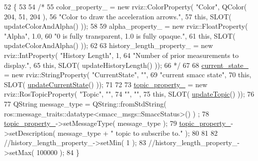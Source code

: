 \begin{DoxyCode}
52 \{
53 
54   \textcolor{comment}{/*}
55 \textcolor{comment}{  color\_property\_ = new rviz::ColorProperty( "Color", QColor( 204, 51, 204 ),}
56 \textcolor{comment}{                                             "Color to draw the acceleration arrows.",}
57 \textcolor{comment}{                                             this, SLOT( updateColorAndAlpha() ));}
58 \textcolor{comment}{}
59 \textcolor{comment}{  alpha\_property\_ = new rviz::FloatProperty( "Alpha", 1.0,}
60 \textcolor{comment}{                                             "0 is fully transparent, 1.0 is fully opaque.",}
61 \textcolor{comment}{                                             this, SLOT( updateColorAndAlpha() ));}
62 \textcolor{comment}{}
63 \textcolor{comment}{  history\_length\_property\_ = new rviz::IntProperty( "History Length", 1,}
64 \textcolor{comment}{                                                    "Number of prior measurements to display.",}
65 \textcolor{comment}{                                                    this, SLOT( updateHistoryLength() ));}
66 \textcolor{comment}{                                                    */}
67 
68   \hyperlink{classsmacc__rviz__plugin_1_1SmaccRvizDisplay_a342ff238c1dfaa427f09ee205a9e92d5}{current\_state\_} = \textcolor{keyword}{new} rviz::StringProperty( \textcolor{stringliteral}{"CurrentState"}, \textcolor{stringliteral}{""},
69                                                     \textcolor{stringliteral}{"current smacc state"},
70                                                     \textcolor{keyword}{this}, SLOT( 
      \hyperlink{classsmacc__rviz__plugin_1_1SmaccRvizDisplay_a6031090e46077a5e95754b5f70ea639a}{updateCurrentState}() ));
71 
72   
73   \hyperlink{classsmacc__rviz__plugin_1_1SmaccRvizDisplay_ad81e5239e1343b2ba01ee16d1f010932}{topic\_property\_} = \textcolor{keyword}{new} rviz::RosTopicProperty( \textcolor{stringliteral}{"Topic"}, \textcolor{stringliteral}{""},
74                                             \textcolor{stringliteral}{""}, \textcolor{stringliteral}{""},
75                                             \textcolor{keyword}{this}, SLOT( \hyperlink{classsmacc__rviz__plugin_1_1SmaccRvizDisplay_adf332ae95bd83969b33ba713a60832fd}{updateTopic}() ));
76 
77   QString message\_type = QString::fromStdString( ros::message\_traits::datatype<smacc\_msgs::SmaccStatus>() )
      ;
78       \hyperlink{classsmacc__rviz__plugin_1_1SmaccRvizDisplay_ad81e5239e1343b2ba01ee16d1f010932}{topic\_property\_}->setMessageType( message\_type );
79       \hyperlink{classsmacc__rviz__plugin_1_1SmaccRvizDisplay_ad81e5239e1343b2ba01ee16d1f010932}{topic\_property\_}->setDescription( message\_type + \textcolor{stringliteral}{" topic to subscribe to."} );
80 
81 
82   \textcolor{comment}{//history\_length\_property\_->setMin( 1 );}
83   \textcolor{comment}{//history\_length\_property\_->setMax( 100000 );}
84 \}
\end{DoxyCode}


